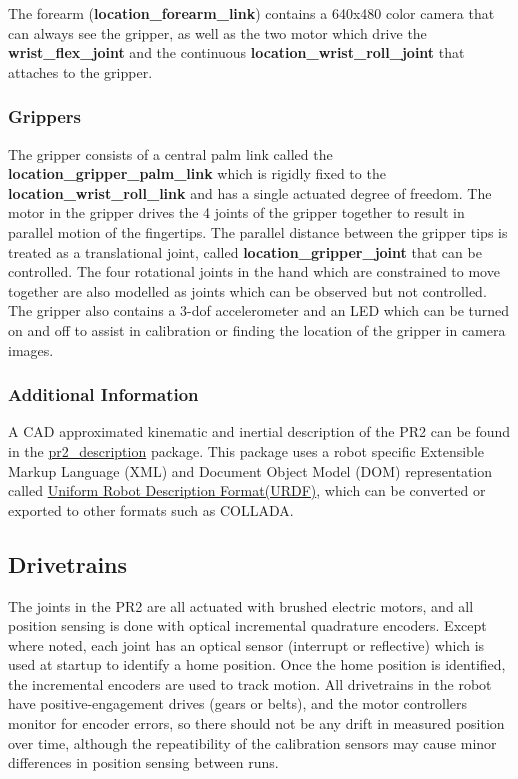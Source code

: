 The forearm ({\bf location\_forearm\_link}) contains a 640x480 color camera that
can always see the gripper, as well as the two motor which drive the {\bf
  wrist\_flex\_joint} and the continuous {\bf location\_wrist\_roll\_joint} that
attaches to the gripper.

\subsubsection{Grippers}
The gripper consists of a central palm link called the {\bf
  location\_gripper\_palm\_link} which is rigidly fixed to the {\bf
  location\_wrist\_roll\_link} and has a single actuated degree of freedom.  The
motor in the gripper drives the 4 joints of the gripper together to result in
parallel motion of the fingertips.  The parallel distance between the gripper
tips is treated as a translational joint, called {\bf location\_gripper\_joint}
that can be controlled.  The four rotational joints in the hand which are
constrained to move together are also modelled as joints which can be observed
but not controlled.  The gripper also contains a 3-dof accelerometer and an LED
which can be turned on and off to assist in calibration or finding the location
of the gripper in camera images.

\subsubsection{Additional Information}
A CAD approximated kinematic and inertial description of the PR2 can be found in
the \href{http://www.ros.org/wiki/pr2\_description}{pr2\_description} package.
This package uses a robot specific Extensible Markup Language (XML) and Document
Object Model (DOM) representation called
\href{http://www.ros.org/wiki/urdf}{Uniform Robot Description Format(URDF)}, which can
be converted or exported to other formats such as COLLADA.


\subsection{Drivetrains}
The joints in the PR2 are all actuated with brushed electric motors, and all
position sensing is done with optical incremental quadrature encoders.  Except
where noted, each joint has an optical sensor (interrupt or reflective) which is
used at startup to identify a home position.  Once the home position is
identified, the incremental encoders are used to track motion.  All drivetrains
in the robot have positive-engagement drives (gears or belts), and the motor
controllers monitor for encoder errors, so there should not be any drift in
measured position over time, although the repeatibility of the calibration
sensors may cause minor differences in position sensing between runs.

